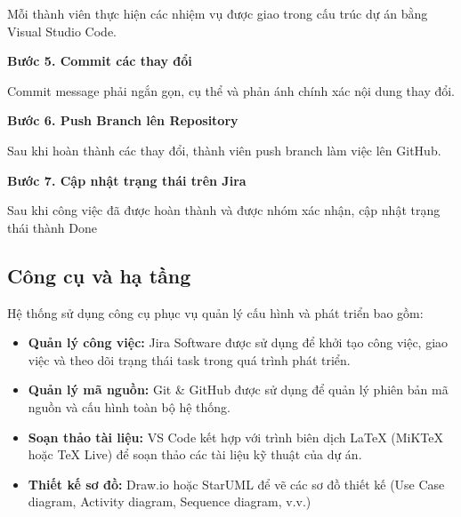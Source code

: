 Mỗi thành viên thực hiện các nhiệm vụ được giao trong cấu trúc dự án bằng Visual Studio Code.

\textbf{Bước 5. Commit các thay đổi}

Commit message phải ngắn gọn, cụ thể và phản ánh chính xác nội dung thay đổi.

\textbf{Bước 6. Push Branch lên Repository}

Sau khi hoàn thành các thay đổi, thành viên push branch làm việc lên GitHub.

\textbf{Bước 7. Cập nhật trạng thái trên Jira}

Sau khi công việc đã được hoàn thành và được nhóm xác nhận, cập nhật trạng thái thành Done

\subsection{Công cụ và hạ tầng}

Hệ thống sử dụng công cụ phục vụ quản lý cấu hình và phát triển bao gồm:

\begin{itemize}
\item
  \textbf{Quản lý công việc:} Jira Software được sử dụng để khởi tạo công việc, giao việc và theo dõi trạng thái task trong quá trình phát triển.
\item
  \textbf{Quản lý mã nguồn:} Git \& GitHub được sử dụng để quản lý phiên bản mã nguồn và cấu hình toàn bộ hệ thống.
\item
  \textbf{Soạn thảo tài liệu:} VS Code kết hợp với trình biên dịch LaTeX (MiKTeX hoặc TeX Live) để soạn thảo các tài liệu kỹ thuật của dự án.
\item
  \textbf{Thiết kế sơ đồ:} Draw.io hoặc StarUML để vẽ các sơ đồ thiết kế (Use Case diagram, Activity diagram, Sequence diagram, v.v.)
\end{itemize}
